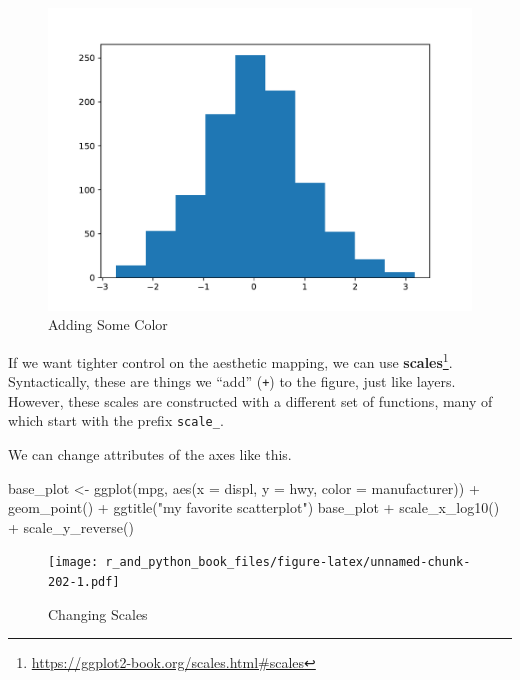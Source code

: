 \documentclass[
  12pt,
  krantz2]{krantz}
\makeatletter
\newenvironment{Shaded}{\begin{snugshade}}{\end{snugshade}}
\newcommand{\AttributeTok}[1]{\textcolor[rgb]{0.61,0.61,0.61}{#1}}
\newcommand{\FunctionTok}[1]{\textcolor[rgb]{0,0,0}{#1}}
\newcommand{\NormalTok}[1]{#1}
\newcommand{\OtherTok}[1]{\textcolor[rgb]{0.37,0.37,0.37}{#1}}
\newcommand{\SpecialCharTok}[1]{\textcolor[rgb]{0,0,0}{#1}}
\newcommand{\StringTok}[1]{\textcolor[rgb]{0.5,0.5,0.5}{#1}}
\renewcommand{\href}[2]{#2\footnote{\url{#1}}}
\newenvironment{kframe}{%
\medskip{}
\setlength{\fboxsep}{.8em}
 \def\at@end@of@kframe{}%
 \ifinner\ifhmode%
  \def\at@end@of@kframe{\end{minipage}}%
  \begin{minipage}{\columnwidth}%
 \fi\fi%
 \def\FrameCommand##1{\hskip\@totalleftmargin \hskip-\fboxsep
 \colorbox{shadecolor}{##1}\hskip-\fboxsep
     \hskip-\linewidth \hskip-\@totalleftmargin \hskip\columnwidth}%
 \MakeFramed {\advance\hsize-\width
   \@totalleftmargin\z@ \linewidth\hsize
   \@setminipage}}%
 {\par\unskip\endMakeFramed%
 \at@end@of@kframe}
\renewenvironment{Shaded}{\begin{kframe}}{\end{kframe}}
\makeatother
\begin{document}
\begin{figure}
\centering
\includegraphics{r_and_python_book_files/figure-latex/unnamed-chunk-201-1.pdf}
\caption{\label{fig:unnamed-chunk-201}Adding Some Color}
\end{figure}

If we want tighter control on the aesthetic mapping, we can use \href{https://ggplot2-book.org/scales.html\#scales}{\textbf{scales}}. Syntactically, these are things we ``add'' (\texttt{+}) to the figure, just like layers. However, these scales are constructed with a different set of functions, many of which start with the prefix \texttt{scale\_}.

We can change attributes of the axes like this.

\begin{Shaded}
\begin{Highlighting}[]
\NormalTok{base\_plot }\OtherTok{\textless{}{-}} \FunctionTok{ggplot}\NormalTok{(mpg, }\FunctionTok{aes}\NormalTok{(}\AttributeTok{x =}\NormalTok{ displ, }\AttributeTok{y =}\NormalTok{ hwy, }\AttributeTok{color =}\NormalTok{ manufacturer))  }\SpecialCharTok{+}
             \FunctionTok{geom\_point}\NormalTok{() }\SpecialCharTok{+} 
             \FunctionTok{ggtitle}\NormalTok{(}\StringTok{"my favorite scatterplot"}\NormalTok{)}
\NormalTok{base\_plot }\SpecialCharTok{+} \FunctionTok{scale\_x\_log10}\NormalTok{() }\SpecialCharTok{+} \FunctionTok{scale\_y\_reverse}\NormalTok{()}
\end{Highlighting}
\end{Shaded}

\begin{figure}
\centering
\texttt{[image: r\_and\_python\_book\_files/figure-latex/unnamed-chunk-202-1.pdf]}
\caption{\label{fig:unnamed-chunk-202}Changing Scales}
\end{figure}
\end{document}
